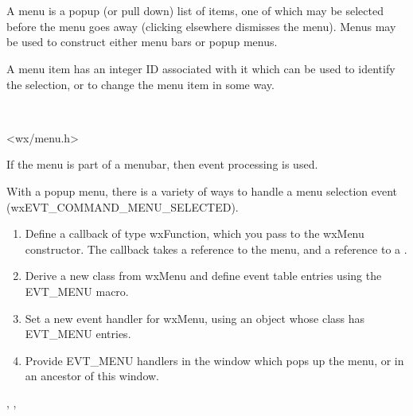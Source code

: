 \section{}\label{wxmenu}

A menu is a popup (or pull down) list of items, one of which may be
selected before the menu goes away (clicking elsewhere dismisses the
menu).  Menus may be used to construct either menu bars or popup menus.

A menu item has an integer ID associated with it which can be used to
identify the selection, or to change the menu item in some way.


\\


<wx/menu.h>


If the menu is part of a menubar, then  event processing is used.

With a popup menu, there is a variety of ways to handle a menu selection event
(wxEVT\_COMMAND\_MENU\_SELECTED).

\begin{enumerate}\itemsep=0pt
\item Define a callback of type wxFunction, which you pass to the wxMenu constructor.
The callback takes a reference to the menu, and a reference to a .
\item Derive a new class from wxMenu and define event table entries using the EVT\_MENU macro.
\item Set a new event handler for wxMenu, using an object whose class has EVT\_MENU entries.
\item Provide EVT\_MENU handlers in the window which pops up the menu, or in an ancestor of
this window.
\end{enumerate}


, ,\rtfsp
{}


\label{wxmenuconstr}


